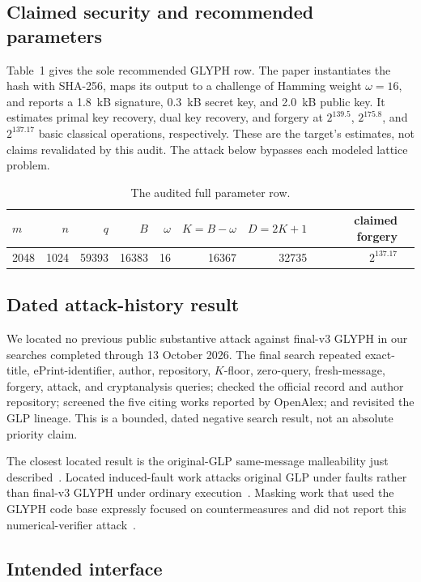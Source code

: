 \documentclass[10pt,a4paper]{article}
\begin{document}
\subsection{Claimed security and recommended parameters}

Table~1 gives the sole recommended GLYPH row.  The paper instantiates the
hash with SHA-256, maps its output to a challenge of Hamming weight
$\omega=16$, and reports a 1.8~kB signature, 0.3~kB secret key, and 2.0~kB
public key.  It estimates primal key recovery, dual key recovery, and forgery
at $2^{139.5}$, $2^{175.8}$, and $2^{137.17}$ basic classical operations,
respectively.  These are the target's estimates, not claims revalidated by
this audit.  The attack below bypasses each modeled lattice problem.

\begin{table}[ht]
\centering
\caption{The audited full parameter row.}
\begin{tabular}{lrrrrrrrr}
\toprule
$m$ & $n$ & $q$ & $B$ & $\omega$ & $K=B-\omega$ & $D=2K+1$ & claimed forgery \\
\midrule
2048 & 1024 & 59393 & 16383 & 16 & 16367 & 32735 & $2^{137.17}$ \\
\bottomrule
\end{tabular}
\end{table}

\subsection{Dated attack-history result}

We located no previous public substantive attack against final-v3 GLYPH in
our searches completed through 13 October 2026.  The final search repeated
exact-title, ePrint-identifier, author, repository, $K$-floor, zero-query,
fresh-message, forgery, attack, and cryptanalysis queries; checked the
official record and author repository; screened the five citing works
reported by OpenAlex; and revisited the GLP lineage.  This is a bounded,
dated negative search result, not an absolute priority claim.

The closest located result is the original-GLP same-message malleability just
described~\cite{ddll}.  Located induced-fault work attacks original GLP under
faults rather than final-v3 GLYPH under ordinary execution~\cite{bindel}.
Masking work that used the GLYPH code base expressly focused on
countermeasures and did not report this numerical-verifier attack~\cite{barthe}.

\subsection{Intended interface}
\end{document}
